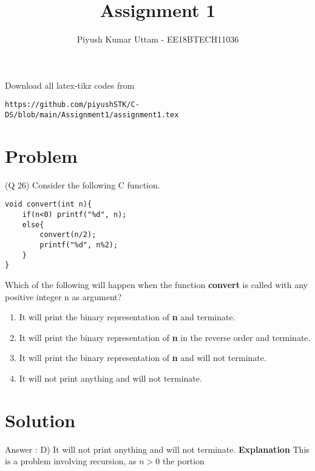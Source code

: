 \documentclass[journal,12pt,twocolumn]{IEEEtran}
\begin{document}
\makeatletter
{}
\makeatother
\let\StandardTheFigure\thefigure
\let\vec\mathbf
\renewcommand{\thefigure}{\theproblem}
\def\putbox#1#2#3{\makebox[0in][l]{\makebox[#1][l]{}\raisebox{\baselineskip}[0in][0in]{\raisebox{#2}[0in][0in]{#3}}}}
     \def\rightbox#1{\makebox[0in][r]{#1}}
     \def\centbox#1{\makebox[0in]{#1}}
     \def\topbox#1{\raisebox{-\baselineskip}[0in][0in]{#1}}
     \def\midbox#1{\raisebox{-0.5\baselineskip}[0in][0in]{#1}}
\vspace{3cm}
\title{Assignment 1}
\author{Piyush Kumar Uttam - EE18BTECH11036}
\maketitle
\newpage
\bigskip
\renewcommand{\thefigure}{\theenumi}
\renewcommand{\thetable}{\theenumi}
Download all latex-tikz codes from 
%
\begin{lstlisting}
https://github.com/piyushSTK/C-DS/blob/main/Assignment1/assignment1.tex
\end{lstlisting}
\setcounter{figure}{0}
\section{Problem}
(Q 26) Consider the following C function.
\begin{lstlisting}
void convert(int n){
    if(n<0) printf("%d", n);
    else{
        convert(n/2);
        printf("%d", n%2);
    }
}
\end{lstlisting}
\setcounter{figure}{0}
Which of the following will happen when the function \textbf{convert} is called with any positive integer n as argument?
\begin{enumerate}
    \item It will print the binary representation of \textbf{n} and terminate.
    \item It will print the binary representation of \textbf{n} in the reverse order and terminate.
    \item It will print the binary representation of \textbf{n} and will not terminate.
    \item It will not print anything and will not terminate.
\end{enumerate}

\section{Solution}
Answer : D) It will not print anything and will not terminate.
\newline
\textbf{Explanation}
\newline
This is a problem involving recursion, as $n>0$ the portion 
\end{document}
